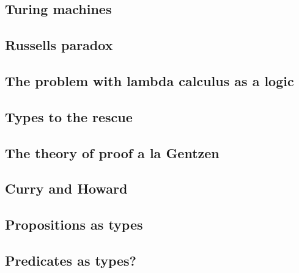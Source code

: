 \subsection{Turing machines}

\subsection{Russells paradox}

\subsection{The problem with lambda calculus as a logic}

\subsection{Types to the rescue}

\subsection{The theory of proof a la Gentzen}

\subsection{Curry and Howard}

\subsection{Propositions as types}

\subsection{Predicates as types?}




